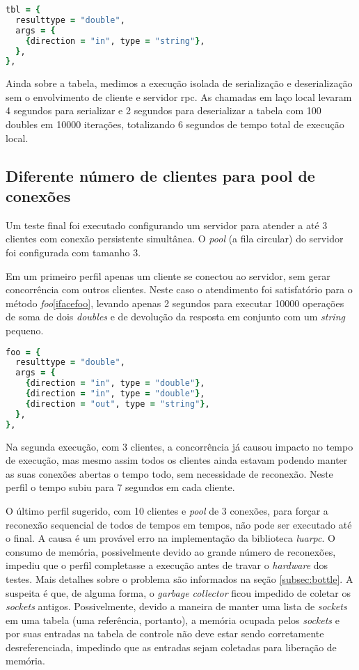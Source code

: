 \documentclass[11pt]{article}
\begin{document}
\begin{lstlisting}[label={ifacetbl},language=Ruby,caption=Interface tbl]
tbl = {
  resulttype = "double",
  args = {
    {direction = "in", type = "string"},
  },
},
\end{lstlisting}

Ainda sobre a tabela, medimos a execução isolada de serialização e
deserialização sem o envolvimento de cliente e servidor \gls{rpc}. As chamadas
em laço local levaram 4 segundos para serializar e 2 segundos para deserializar
a tabela com 100 doubles em 10000 iterações, totalizando 6 segundos de tempo
total de execução local.

\subsection{Diferente número de clientes para pool de conexões}\label{subsec:diffpool}

Um teste final foi executado configurando um servidor para atender a até 3
clientes com conexão persistente simultânea. O \textit{pool} (a fila circular)
do servidor foi configurada com tamanho 3.

Em um primeiro perfil apenas um cliente se conectou ao servidor, sem gerar
concorrência com outros clientes. Neste caso o atendimento foi satisfatório
para o método \textit{foo}\ref{ifacefoo}, levando apenas 2 segundos para
executar 10000 operações de soma de dois \textit{doubles} e de devolução da
resposta em conjunto com um \textit{string} pequeno.

\begin{lstlisting}[label={ifacefoo},language=Ruby,caption=Interface foo]
foo = {
  resulttype = "double",
  args = {
    {direction = "in", type = "double"},
    {direction = "in", type = "double"},
    {direction = "out", type = "string"},
  },
},
\end{lstlisting}

Na segunda execução, com 3 clientes, a concorrência já causou impacto no tempo
de execução, mas mesmo assim todos os clientes ainda estavam podendo manter as
suas conexões abertas o tempo todo, sem necessidade de reconexão. Neste perfil
o tempo subiu para 7 segundos em cada cliente.

O último perfil sugerido, com 10 clientes e \textit{pool} de 3 conexões, para
forçar a reconexão sequencial de todos de tempos em tempos, não pode ser
executado até o final. A causa é um provável erro na implementação da
biblioteca \textit{luarpc}. O consumo de memória, possivelmente devido ao
grande número de reconexões, impediu que o perfil completasse a execução antes
de travar o \textit{hardware} dos testes. Mais detalhes sobre o problema são
informados na seção \ref{subsec:bottle}. A suspeita é que, de alguma forma, o
\textit{garbage collector} ficou impedido de coletar os \textit{sockets}
antigos. Possivelmente, devido a maneira de manter uma lista de
\textit{sockets} em uma tabela (uma referência, portanto), a memória ocupada
pelos \textit{sockets} e por suas entradas na tabela de controle não deve estar
sendo corretamente desreferenciada, impedindo que as entradas sejam coletadas
para liberação de memória.
\end{document}

